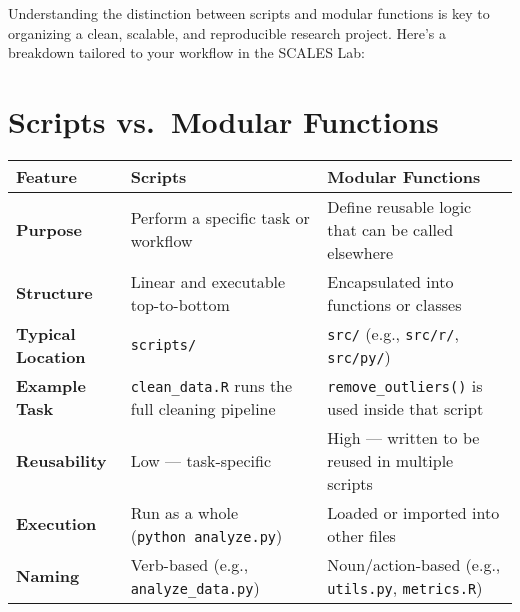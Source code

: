 \documentclass[
  letterpaper,
  DIV=11,
  numbers=noendperiod]{scrreprt}
\begin{document}
Understanding the distinction between scripts and modular functions is
key to organizing a clean, scalable, and reproducible research project.
Here's a breakdown tailored to your workflow in the SCALES Lab:

\section{Scripts vs.~Modular
Functions}\label{scripts-vs.-modular-functions}

\begin{longtable}[]{@{}
  >{\raggedright\arraybackslash}p{}
  >{\raggedright\arraybackslash}p{}
  >{\raggedright\arraybackslash}p{}@{}}
\toprule\noalign{}
\begin{minipage}[b]{\linewidth}\raggedright
Feature
\end{minipage} & \begin{minipage}[b]{\linewidth}\raggedright
\textbf{Scripts}
\end{minipage} & \begin{minipage}[b]{\linewidth}\raggedright
\textbf{Modular Functions}
\end{minipage} \\
\midrule\noalign{}
\endhead
\bottomrule\noalign{}
\endlastfoot
\textbf{Purpose} & Perform a specific task or workflow & Define reusable
logic that can be called elsewhere \\
\textbf{Structure} & Linear and executable top-to-bottom & Encapsulated
into functions or classes \\
\textbf{Typical Location} & \texttt{scripts/} & \texttt{src/} (e.g.,
\texttt{src/r/}, \texttt{src/py/}) \\
\textbf{Example Task} & \texttt{clean\_data.R} runs the full cleaning
pipeline & \texttt{remove\_outliers()} is used inside that script \\
\textbf{Reusability} & Low --- task-specific & High --- written to be
reused in multiple scripts \\
\textbf{Execution} & Run as a whole (\texttt{python\ analyze.py}) &
Loaded or imported into other files \\
\textbf{Naming} & Verb-based (e.g., \texttt{analyze\_data.py}) &
Noun/action-based (e.g., \texttt{utils.py}, \texttt{metrics.R}) \\
\end{longtable}
\end{document}
